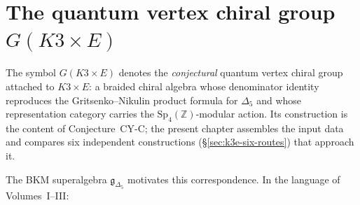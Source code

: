 \section{The quantum vertex chiral group \texorpdfstring{$G(K3 \times E)$}{G(K3 x E)}}
\label{sec:k3e-qvcg}

The symbol $G(K3 \times E)$ denotes the \emph{conjectural} quantum vertex chiral group attached to $K3 \times E$: a braided chiral algebra whose denominator identity reproduces the Gritsenko--Nikulin product formula for $\Delta_5$ and whose representation category carries the $\mathrm{Sp}_4(\mathbb{Z})$-modular action. Its construction is the content of Conjecture~CY-C; the present chapter assembles the input data and compares six independent constructions (§\ref{sec:k3e-six-routes}) that approach it.

The BKM superalgebra $\mathfrak{g}_{\Delta_5}$ motivates this correspondence. In the language of Volumes~I--III:

